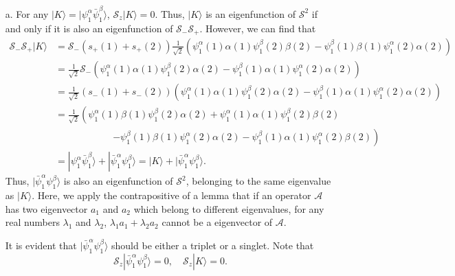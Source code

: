 \documentclass[a4paper]{book}
\newcounter{solution}[chapter]
\begin{document}
	\begin{solution}
	
	\begin{itemize}
	
	\item[a.] For any $| K \rangle = |\psi_1^\alpha \bar{\psi}^\beta_1 \rangle$, $\mathscr{S}_z | K \rangle = 0$. Thus, $| K \rangle$ is an eigenfunction of $\mathscr{S}^2$ if and only if it is also an eigenfunction of $\mathscr{S}_- \mathscr{S}_+$. However, we can find that	
	\begin{align*}
		\mathscr{S}_- \mathscr{S}_+ | K \rangle &= \mathscr{S}_- ( s_+(1) + s_+(2) ) \frac{1}{ \sqrt{2} } \left( \psi^\alpha_1(1) \alpha(1) \psi^\beta_1(2) \beta(2) - \psi^\beta_1(1) \beta(1) \psi^\alpha_1(2) \alpha(2) \right) \\
		&= \frac{1}{ \sqrt{2} } \mathscr{S}_- \left( \psi^\alpha_1(1) \alpha(1) \psi^\beta_1(2) \alpha(2) - \psi^\beta_1(1) \alpha(1) \psi^\alpha_1(2) \alpha(2) \right) \\
		&= \frac{1}{ \sqrt{2} } ( s_-(1) + s_-(2) ) \left( \psi^\alpha_1(1) \alpha(1) \psi^\beta_1(2) \alpha(2) - \psi^\beta_1(1) \alpha(1) \psi^\alpha_1(2) \alpha(2) \right) \\
		&= \frac{1}{ \sqrt{2} } \left( \psi^\alpha_1(1) \beta(1) \psi^\beta_1(2) \alpha(2) + \psi^\alpha_1(1) \alpha(1) \psi^\beta_1(2) \beta(2) \right. \\
		&\hspace{6em} \left. - \psi^\beta_1(1) \beta(1) \psi^\alpha_1(2) \alpha(2) - \psi^\beta_1(1) \alpha(1) \psi^\alpha_1(2) \beta(2) \right) \\
		&= | \psi_1^\alpha \bar{\psi}^\beta_1 \rangle + |\bar{\psi}_1^\alpha \psi^\beta_1 \rangle = | K \rangle + |\bar{\psi}_1^\alpha \psi^\beta_1 \rangle.
	\end{align*}
	Thus, $|\bar{\psi}_1^\alpha \psi^\beta_1 \rangle$ is also an eigenfunction of $\mathscr{S}^2$, belonging to the same eigenvalue as $| K \rangle$. Here, we apply the contrapositive of a lemma that if an operator $\mathscr{A}$ has two eigenvector $a_1$ and $a_2$ which belong to different eigenvalues, for any real numbers $\lambda_1$ and $\lambda_2$, $\lambda_1 a_1 + \lambda_2 a_2$ cannot be a eigenvector of $\mathscr{A}$.
	
	It is evident that $|\bar{\psi}_1^\alpha \psi^\beta_1 \rangle$ should be either a triplet or a singlet. Note that
	\[
		\mathscr{S}_z | \bar{\psi}_1^\alpha \psi^\beta_1 \rangle = 0 , \quad \mathscr{S}_z | K \rangle = 0.
	\]
	\begin{itemize}
	

\end{itemize}
\end{itemize}
\end{solution}
\end{document}
